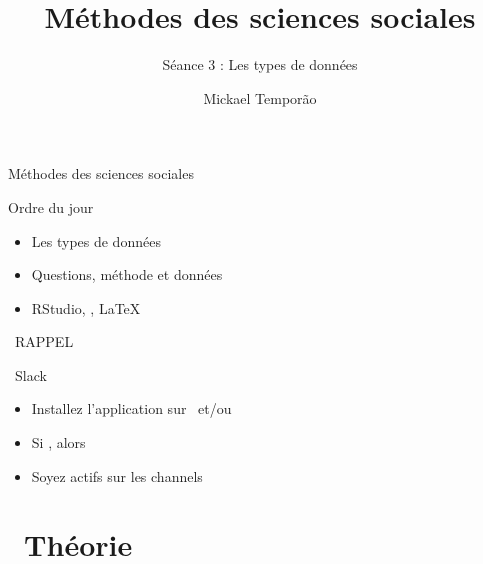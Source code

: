\documentclass[10pt]{beamer}
\title{Méthodes des sciences sociales}
\subtitle{Séance 3 : Les types de données}
\author{Mickael Temporão}
\institute{\faEnvelope~$m.temporao@sciencespobordeaux.fr$\\\faTwitter~$@mickaeltemporao$}
\date{}
\begin{document}
\maketitle

\begin{frame}{Méthodes des sciences sociales}
    \begin{block}{Ordre du jour}
        \begin{itemize}
            \item[\faBook] Les types de données
            \item[\faFlask] Questions, méthode et données
            \item[\faLaptopCode] RStudio, \faRProject, \LaTeX
        \end{itemize}
    \end{block}
\end{frame}

\begin{frame}{\faExclamationTriangle~RAPPEL}
        \begin{block}{\faSlack~Slack}
            \begin{itemize}
                \item<2-> Installez l'application sur \faLaptop~et/ou \faMobile
                \item<3-> Si \faAt, alors \faReply
                \item<4-> Soyez actifs sur les \faHashtag channels
            \end{itemize}
        \end{block}
\end{frame}

\section{\faBook~Théorie}
\end{document}
